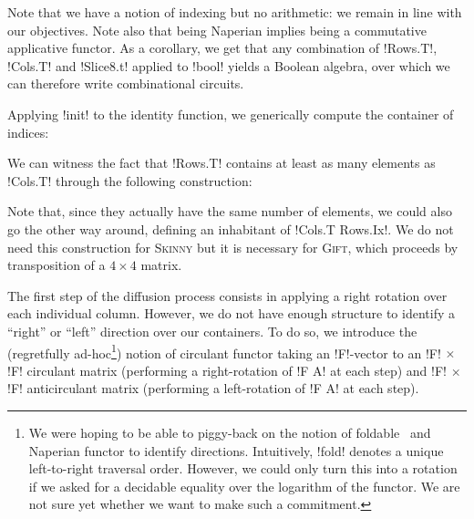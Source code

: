 \documentclass[draft,english]{jflart}
\newcommand{\Skinny}{\textsc{Skinny}}
\newcommand{\Gift}{\textsc{Gift}}
\begin{document}
Note that we have a notion of indexing but no arithmetic: we remain in
line with our objectives. Note also that being Naperian implies being
a commutative applicative functor. As a corollary, we get that any
combination of \coqe!Rows.T!, \coqe!Cols.T! and \coqe!Slice8.t!
applied to \coqe!bool! yields a Boolean algebra, over which we can
therefore write combinational circuits.


Applying \coqe!init! to the identity function, we generically compute
the container of indices:
%

We can witness the fact that \coqe!Rows.T! contains at least as many
elements as \coqe!Cols.T! through the following construction:
%

Note that, since they actually have the same number of elements, we
could also go the other way around, defining an inhabitant of
\coqe!Cols.T Rows.Ix!. We do not need this construction for \Skinny{}
but it is necessary for \Gift{}, which proceeds by transposition of a
$4 \times 4$ matrix.


The first step of the diffusion process consists in applying a right
rotation over each individual column. However, we do not have enough
structure to identify a ``right'' or ``left'' direction over our
containers. To do so, we introduce the (regretfully ad-hoc\footnote{We
were hoping to be able to piggy-back on the notion of
foldable~\citep{yorgey:typeclassopedia} and Naperian functor to
identify directions. Intuitively, \coqe!fold! denotes a unique
left-to-right traversal order. However, we could only turn this into a
rotation if we asked for a decidable equality over the logarithm of
the functor. We are not sure yet whether we want to make such a
commitment.}) notion of circulant functor
%
%
taking an \coqe!F!-vector to an \coqe!F! $\times$ \coqe!F! circulant
matrix (performing a right-rotation of \coqe!F A! at each step) and
\coqe!F! $\times$ \coqe!F! anticirculant matrix (performing a
left-rotation of \coqe!F A! at each step).

\end{document}
